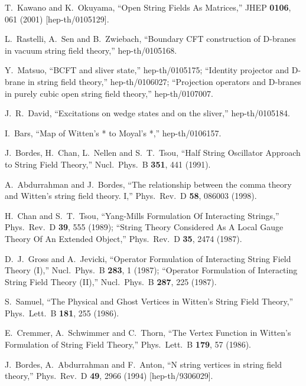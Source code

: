 \documentclass[a4paper,12pt]{article}
\begin{document}
\begin{thebibliography}{999}
T.~Kawano and K.~Okuyama,
``Open String Fields As Matrices,''
JHEP {\bf 0106}, 061 (2001) [hep-th/0105129].




L.~Rastelli, A.~Sen and B.~Zwiebach,
``Boundary CFT construction of D-branes in vacuum string field theory,''
hep-th/0105168.



Y.~Matsuo,
``BCFT and sliver state,''
hep-th/0105175;
``Identity projector and D-brane in string field theory,''
hep-th/0106027;
``Projection operators and D-branes in 
purely cubic open string field  theory,''
hep-th/0107007.

J.~R.~David,
``Excitations on wedge states and on the sliver,''
hep-th/0105184.

I.~Bars,
``Map of Witten's * to Moyal's *,''
hep-th/0106157.

J.~Bordes, H.~Chan, L.~Nellen and S.~T.~Tsou,
``Half String Oscillator Approach to String Field Theory,''
Nucl.\ Phys.\ B {\bf 351}, 441 (1991).

A.~Abdurrahman and J.~Bordes,
``The relationship between the comma theory 
and Witten's string field  theory. I,''
Phys.\ Rev.\ D {\bf 58}, 086003 (1998).

H.~Chan and S.~T.~Tsou,
``Yang-Mills Formulation Of Interacting Strings,''
Phys.\ Rev.\ D {\bf 39}, 555 (1989);
``String Theory Considered As A Local Gauge Theory Of An Extended Object,''
Phys.\ Rev.\ D {\bf 35}, 2474 (1987).



D.~J.~Gross and A.~Jevicki,
``Operator Formulation of Interacting String Field Theory (I),''
Nucl.\ Phys.\ B {\bf 283}, 1 (1987);
``Operator Formulation of Interacting String Field Theory (II),''
Nucl.\ Phys.\ B {\bf 287}, 225 (1987).


S.~Samuel,
``The Physical and Ghost Vertices in Witten's String Field Theory,''
Phys.\ Lett.\ B {\bf 181}, 255 (1986).

E.~Cremmer, A.~Schwimmer and C.~Thorn,
``The Vertex Function in Witten's Formulation of String Field Theory,''
Phys.\ Lett.\ B {\bf 179}, 57 (1986).

J.~Bordes, A.~Abdurrahman and F.~Anton,
``N string vertices in string field theory,''
Phys.\ Rev.\ D {\bf 49}, 2966 (1994)
[hep-th/9306029].

\end{thebibliography}
\end{document}
